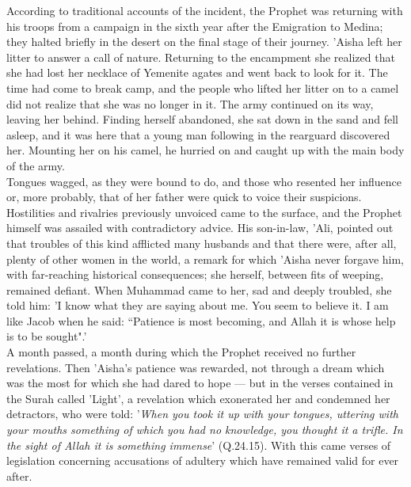 \documentclass[10pt, twoside]{book}
\begin{document}
According to traditional accounts of the incident, the Prophet was returning with his troops from a 
campaign in the sixth year after the Emigration to Medina; they halted briefly in the desert on the 
final stage of their journey. 'Aisha left her litter to answer a call of nature. Returning to the 
encampment she realized that she had lost her necklace of Yemenite agates and went back to look for 
it. The time had come to break camp, and the people who lifted her litter on to a camel did not 
realize that she was no longer in it. The army continued on its way, leaving her behind. Finding 
herself abandoned, she sat down in the sand and fell asleep, and it was here that a young man 
following in the rearguard discovered her. Mounting her on his camel, he hurried on and caught up 
with the main body of the army. \\

Tongues wagged, as they were bound to do, and those who resented her influence or, more probably, 
that of her father were quick to voice their suspicions. Hostilities and rivalries previously 
unvoiced came to the surface, and the Prophet himself was assailed with contradictory advice. His 
son\hyp{}in\hyp{}law, 'Ali, pointed out that troubles of this kind afflicted many husbands and that there were, 
after all, plenty of other women in the world, a remark for which 'Aisha never forgave him, with 
far-reaching historical consequences; she herself, between fits of weeping, remained defiant. When 
Muhammad came to her, sad and deeply troubled, she told him: 'I know what they are saying about me. 
You seem to believe it. I am like Jacob when he said: ``Patience is most becoming, and Allah it is 
whose help is to be sought".' \\

A month passed, a month during which the Prophet received no further revelations. Then 'Aisha's 
patience was rewarded, not through a dream which was the most for which she had dared to hope --- but 
in the verses contained in the Surah called 'Light', a revelation which exonerated her and condemned 
her detractors, who were told: '\emph{When you took it up with your tongues, uttering with your mouths 
something of which you had no knowledge, you thought it a trifle. In the sight of Allah it is 
something immense}' (Q.24.15). With this came verses of legislation concerning accusations of adultery 
which have remained valid for ever after. \\
\end{document}

